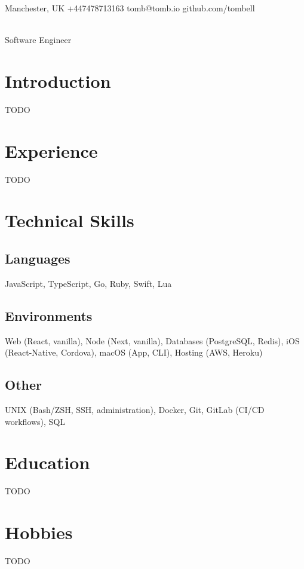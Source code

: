 \documentclass[11pt,a4paper]{article}
\renewcommand{\maketitle}{
  \begin{center}
    {\huge\bfseries\theauthor} \\
    \normalsize Software Engineer
  \end{center}
}
\begin{document}
  \begin{center}
    \small
    \raisebox{-0.1\height}{\small\faMapMarker} Manchester, UK
    \hspace{1cm}
    \raisebox{-0.1\height}{\small\faMobile} +447478713163
    \hspace{1cm}
    \raisebox{-0.1\height}{\small\faAt} tomb@tomb.io
    \hspace{1cm}
    \raisebox{-0.1\height}{\small\faGithubAlt} github.com/tombell
  \end{center}

  \author{Tom Bell}
  \maketitle

  \section{Introduction}
  \small TODO

  \section{Experience}
  \small TODO

  \section{Technical Skills}
  \subsection{Languages}
  \small JavaScript, TypeScript, Go, Ruby, Swift, Lua
  \subsection{Environments}
  \small Web (React, vanilla), Node (Next, vanilla), Databases (PostgreSQL, Redis), iOS (React-Native, Cordova), macOS (App, CLI), Hosting (AWS, Heroku)
  \subsection{Other}
  \small UNIX (Bash/ZSH, SSH, administration), Docker, Git, GitLab (CI/CD workflows), SQL

  \section{Education}
  \small TODO

  \section{Hobbies}
  \small TODO
\end{document}
